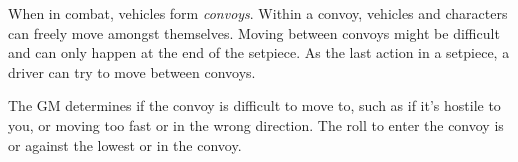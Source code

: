
When in combat, vehicles form \emph{convoys}. Within a convoy, vehicles and characters can freely move amongst themselves. Moving between convoys might be difficult and can only happen at the end of the setpiece. As the last action in a setpiece, a driver can try to move between convoys.

The GM determines if the convoy is difficult to move to, such as if it's hostile to you, or moving too fast or in the wrong direction. The roll to enter the convoy is  or  against the lowest  or  in the convoy.
